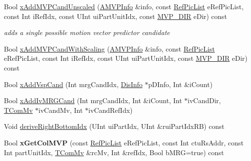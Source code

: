 \begin{DoxyCompactItemize}
\item 
\mbox{\label{class_t_com_data_c_u_a13b3e24ed9868985f9d311151ef47b21}} 
Bool \hyperlink{class_t_com_data_c_u_a13b3e24ed9868985f9d311151ef47b21}{x\+Add\+M\+V\+P\+Cand\+Unscaled} (\hyperlink{_t_com_motion_info_8h_a4dfe7465dec69a9356d5166304173f8c}{A\+M\+V\+P\+Info} \&info, const \hyperlink{_type_def_8h_a93cea48eb9dcfd661168dee82e41b384}{Ref\+Pic\+List} e\+Ref\+Pic\+List, const Int i\+Ref\+Idx, const U\+Int ui\+Part\+Unit\+Idx, const \hyperlink{_type_def_8h_ab69fb1032d1b3f894ad3dd01e564e7e2}{M\+V\+P\+\_\+\+D\+IR} e\+Dir) const
\begin{DoxyCompactList}\small\item\em adds a single possible motion vector predictor candidate \end{DoxyCompactList}\item 
Bool \hyperlink{class_t_com_data_c_u_af40cec1fd2306b694327d4d8819c7cd4}{x\+Add\+M\+V\+P\+Cand\+With\+Scaling} (\hyperlink{_t_com_motion_info_8h_a4dfe7465dec69a9356d5166304173f8c}{A\+M\+V\+P\+Info} \&info, const \hyperlink{_type_def_8h_a93cea48eb9dcfd661168dee82e41b384}{Ref\+Pic\+List} e\+Ref\+Pic\+List, const Int i\+Ref\+Idx, const U\+Int ui\+Part\+Unit\+Idx, const \hyperlink{_type_def_8h_ab69fb1032d1b3f894ad3dd01e564e7e2}{M\+V\+P\+\_\+\+D\+IR} e\+Dir) const
\item 
Bool \hyperlink{class_t_com_data_c_u_a90212ef9990c07d10909f20ddad2cd93}{x\+Add\+Vsp\+Cand} (Int mrg\+Cand\+Idx, \hyperlink{struct___dis_cand}{Dis\+Info} $\ast$p\+D\+Info, Int \&i\+Count)
\item 
Bool \hyperlink{class_t_com_data_c_u_af79c124d8e9ce3c80d74fb8a1f52b805}{x\+Add\+Iv\+M\+R\+G\+Cand} (Int mrg\+Cand\+Idx, Int \&i\+Count, Int $\ast$iv\+Cand\+Dir, \hyperlink{class_t_com_mv}{T\+Com\+Mv} $\ast$iv\+Cand\+Mv, Int $\ast$iv\+Cand\+Ref\+Idx)
\item 
Void \hyperlink{class_t_com_data_c_u_a50d686881ee718b8d1b706a28ef9ae9f}{derive\+Right\+Bottom\+Idx} (U\+Int ui\+Part\+Idx, U\+Int \&rui\+Part\+Idx\+RB) const
\item 
\mbox{\label{class_t_com_data_c_u_a1d40c52c132cd33cacb261e791407947}} 
Bool {\bfseries x\+Get\+Col\+M\+VP} (const \hyperlink{_type_def_8h_a93cea48eb9dcfd661168dee82e41b384}{Ref\+Pic\+List} e\+Ref\+Pic\+List, const Int ctu\+Rs\+Addr, const Int part\+Unit\+Idx, \hyperlink{class_t_com_mv}{T\+Com\+Mv} \&rc\+Mv, Int \&ref\+Idx, Bool b\+M\+RG=true) const

\end{DoxyCompactItemize}
